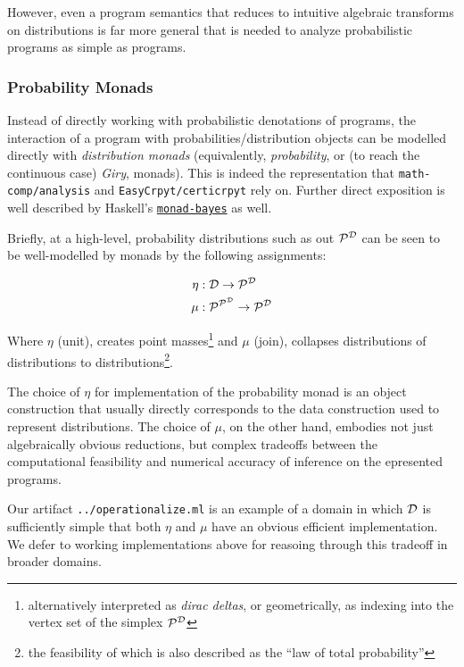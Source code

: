 \documentclass{article}
\begin{document}
However, even a program semantics that reduces to intuitive algebraic transforms on distributions is far more general that is needed to analyze probabilistic programs as simple as \AIM programs.

\subsubsection{Probability Monads}


Instead of directly working with probabilistic denotations of programs, the interaction of a program with probabilities/distribution objects can be modelled directly with \textit{distribution monads} (equivalently, \textit{probability}, or (to reach the continuous case) \textit{Giry}, monads). This is indeed the representation that \texttt{math-comp/analysis} and \texttt{EasyCrpyt/certicrpyt} rely on. Further direct exposition is well described by Haskell's \href{https://hackage.haskell.org/package/monad-bayes}{\texttt{monad-bayes}} as well.

Briefly, at a high-level, probability distributions such as out $\mathcal{P}^{\mathcal{D}}$ can be seen to be well-modelled by monads by the following assignments:

\begin{align*}
  \eta&: \mathcal{D} \to \mathcal{P}^{\mathcal{D}} \\
  \mu&: \mathcal{P}^{\mathcal{P}^{\mathcal{D}}} \to \mathcal{P}^{\mathcal{D}} \\        
\end{align*}

Where $\eta$ (unit), creates point masses\footnote{alternatively interpreted as \textit{dirac deltas}, or geometrically, as indexing into the vertex set of the simplex $\mathcal{P}^{\mathcal{D}}$} and $\mu$ (join), collapses distributions of distributions to distributions\footnote{the feasibility of which is also described as the ``law of total probability''}.

The choice of $\eta$ for implementation of the probability monad is an object construction that usually directly corresponds to the data construction used to represent distributions. The choice of $\mu$, on the other hand, embodies not just algebraically obvious reductions, but complex tradeoffs between the computational feasibility and numerical accuracy of inference on the epresented programs.

Our artifact \texttt{../operationalize.ml} is an example of a domain in which $\mathcal{D}$ is sufficiently simple that both $\eta$ and $\mu$ have an obvious efficient implementation. We defer to working implementations above for reasoing through this tradeoff in broader domains.
\end{document}
